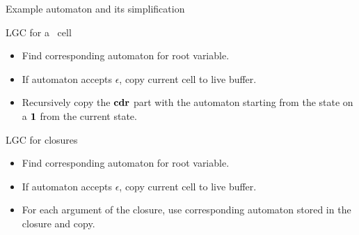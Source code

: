 \documentclass[xcolor=x11names,compress,mathserif]{beamer}
\renewcommand{\(}{\begin{columns}}
\renewcommand{\)}{\end{columns}}
\newcommand{\<}[1]{\begin{column}{#1}}
\renewcommand{\>}{\end{column}}
\begin{document}

\begin{frame}{Example automaton and its simplification}

\end{frame}

\begin{frame}{LGC for a \CONS\ cell}
      \begin{itemize}
      \item Find corresponding automaton for root variable.
      \item If automaton accepts $\epsilon$, copy current cell to live buffer.
      \item Recursively copy the $\mbox{$\mathbf{cdr}$}$ part with the automaton starting from the state on a $\mathbf{1}$ from the current state.
      
      \end{itemize}
\end{frame}

\begin{frame}{LGC for closures}
      \begin{itemize}
      \item Find corresponding automaton for root variable.
      \item If automaton accepts $\epsilon$, copy current cell to live buffer.
      \item For each argument of the closure, use corresponding automaton stored in the closure and copy.
      
      \end{itemize}
\end{frame}

\end{document}

